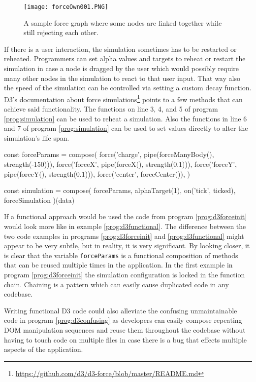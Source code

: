 \begin{figure}
  \centering
  \texttt{[image: forceOwn001.PNG]}
  \caption{A sample force graph where some nodes are linked together while still rejecting each other.}
  \label{fig:force005}
\end{figure}

If there is a user interaction, the simulation sometimes has to be restarted or reheated. Programmers can set alpha values and targets to reheat or restart the simulation in case a node is dragged by the user which would possibly require many other nodes in the simulation to react to that user input. That way also the speed of the simulation can be controlled via setting a custom decay function. D3's documentation about force simulations\footnote{\url{https://github.com/d3/d3-force/blob/master/README.md}} points to a few methods that can achieve said functionality. The functions on line 3, 4, and 5 of program \ref{prog:simulation} can be used to reheat a simulation. Also the functions in line 6 and 7 of program \ref{prog:simulation} can be used to set values directly to alter the simulation's life span.

\begin{program}
\caption{D3 written in a fictional functional way}
\label{prog:d3functional}
\begin{JsCode}
const forceParams = compose(
  force('charge', pipe(forceManyBody(), strength(-150))),
  force('forceX', pipe(forceX(), strength(0.1))),
  force('forceY', pipe(forceY(), strength(0.1))),
  force('center', forceCenter()),
)

const simulation = compose(
  forceParams,
  alphaTarget(1),
  on('tick', ticked),
  forceSimulation
)(data)
\end{JsCode}
\end{program}

If a functional approach would be used the code from program \ref{prog:d3forceinit} would look more like in example \ref{prog:d3functional}. The difference between the two code examples in programs \ref{prog:d3forceinit} and \ref{prog:d3functional} might appear to be very subtle, but in reality, it is very significant. By looking closer, it is clear that the variable \texttt{forceParams} is a functional composition of methods that can be reused multiple times in the application. In the first example in program \ref{prog:d3forceinit} the simulation configuration is locked in the function chain. Chaining is a pattern which can easily cause duplicated code in any codebase. 

Writing functional D3 code could also alleviate the confusing unmaintainable code in program \ref{prog:d3confusing} as developers can easily compose repeating DOM manipulation sequences and reuse them throughout the codebase without having to touch code on multiple files in case there is a bug that effects multiple aspects of the application.
